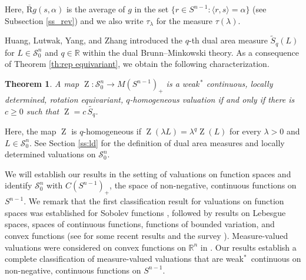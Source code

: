 \documentclass[11pt, a4paper]{amsart}
\newtheorem{theorem}[proposition]{Theorem}
\newcommand{\sn}{{S^{n-1}}}
\newcommand{\oZ}{\operatorname{Z}}
\newcommand{\starn}{\mathcal S_{\scriptscriptstyle 0}^n}
\newcommand{\measn}{M(\sn )_{\scriptscriptstyle +}}
\newcommand{\cfn}{C(\sn )_{\scriptscriptstyle +}}
\newcommand{\R}{\mathbb R}
\newcommand{\radon}{\operatorname{\overline R}}
\newcommand{\rhot}{\tau}
\begin{document}
\noindent
Here, $\radon g(s,\alpha)$ is the average of $g$ in the set $\{r\in\sn:\langle r,s\rangle=\alpha\}$ (see Subsection \ref{ss_rev}) and we also write $\rhot_\lambda$ for the measure $\rhot(\lambda)$.

Huang, Lutwak, Yang, and Zhang \cite{HLYZ} introduced the $q$-th dual area measure  $\tilde S_q(L)$ for $L\in\starn$  and $q\in\R$  within the dual Brunn--Minkowski theory. As a consequence of Theorem \ref{th:rep equivariant}, we obtain the following characterization.


\begin{theorem}\label{t:char}
A map $\oZ\colon \starn\to \measn$ is a weak$^{\,*}\!$ continuous, locally determined, rotation equi\-variant, $q$-homogeneous valuation if and only if there is $c\ge 0$ such that 
$\oZ=c\,\tilde{S_q}$. 
\end{theorem}

\noindent
Here, the map $\oZ$ is $q$-homogeneous if $\oZ(\lambda L)=\lambda^q\oZ(L)$ for every $\lambda>0$ and $L\in\starn$.
See Section \ref{ss:ld} for the definition of dual area measures and locally determined valuations on $\starn$. 

\goodbreak
We will establish our results in the setting of valuations on function spaces and identify $\starn$ with $\cfn$, the space of non-negative, continuous functions on $\sn$. We remark that the first classification result for valuations on function spaces was established for Sobolev functions \cite{ML2012}, followed by results on Lebesgue spaces, spaces of continuous functions, functions of bounded variation, and convex functions  (see \cite{Alesker, CLM2017, CLM2019, CLM2020, CLM2022, CLM2023, CLM2024, CLM2024b, CPTV2020, CPTV2021, Knoerr2024, Knoerr2024b, KnoerrUlivelli, LiL, LiMa, ML2011, mouamine2025klain, Mussnig2019, Mussnig2021, Mussnig2021b, TrViJMAA, TrViIntRep, TrViLattices, Tsang, Vi, Wang2014} for some recent results and the survey \cite{ML2023}). Measure-valued valuations were considered on convex functions on $\R^n$ in \cite{Knoerr2024b, LiL}. Our results establish a complete classification of measure-valued valuations that are weak$^*$~continuous on non-negative, continuous functions on $\sn$.  
\end{document}
